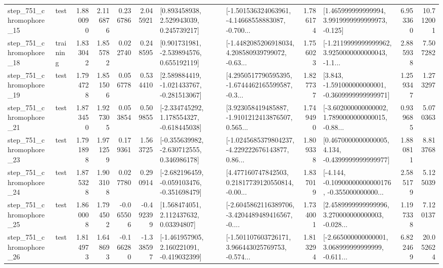 \begin{tabular}{llrrrrllrlrr}
  step\_751\_chromophore\_15 &      test &      1.880090 &    2.116876 &      0.236786 &  2.045921 &     [0.893458938, 2.529943039, 0.245739217] &  [-1.501536324063961, -4.14668558883087, -0.700... &       1.786174 &    [1.465999999999994, 3.9919999999999973, -0.125] &            6.953360 &         10.712001 \\
  step\_751\_chromophore\_18 &  training &      1.833042 &    1.855782 &      0.022740 &  0.248595 &    [0.901731981, -2.539894576, 0.655192119] &  [-1.4482085206918034, 4.208580939799072, -0.63... &       1.756023 &  [-1.2119999999999962, 3.9250000000000043, -1.1... &            2.885938 &          7.507282 \\
  step\_751\_chromophore\_19 &      test &      1.794728 &    1.851506 &      0.056778 &  0.534410 &   [2.589884419, -1.021433767, -0.281513067] &  [4.2950517790595395, -1.6744462165599587, -0.3... &       1.827737 &   [3.843, -1.591000000000001, -0.3609999999999971] &            1.259347 &          1.273297 \\
  step\_751\_chromophore\_21 &      test &      1.873450 &    1.927305 &      0.053854 &  0.509855 &   [-2.334745292, 1.178554327, -0.618445038] &  [3.923058419485887, -1.9101212413876507, 0.565... &       1.749490 &  [-3.602000000000002, 1.7890000000000015, -0.88... &            0.939685 &          5.070363 \\
  step\_751\_chromophore\_23 &      test &      1.791898 &    1.971259 &      0.179361 &  1.563725 &   [-0.355639982, -2.630712555, 0.346986178] &  [-1.0245685379804237, -4.229222676143877, 0.86... &       1.809338 &   [0.4670000000000005, 4.134, -0.4399999999999977] &            1.880811 &          8.813768 \\
  step\_751\_chromophore\_24 &      test &      1.875328 &    1.903108 &      0.027780 &  0.290914 &  [-2.682196459, -0.059103476, -0.351698479] &  [4.477160747842503, 0.21817739120550814, -0.00... &       1.837019 &  [-4.144, -0.10900000000000176, -0.355000000000... &            2.585179 &          5.125039 \\
  step\_751\_chromophore\_25 &      test &      1.860008 &    1.794502 &     -0.065506 & -0.492399 &      [1.568474051, 2.112437632, 0.03394807] &  [-2.6045862116389706, -3.4204489489416567, -0.... &       1.734001 &  [2.4589999999999996, 3.270000000000003, -0.028... &            1.197338 &          7.120137 \\
  step\_751\_chromophore\_26 &      test &      1.814973 &    1.648693 &     -0.166280 & -1.338597 &   [-1.461957905, 2.160221091, -0.419032399] &  [-1.501107603726171, 3.966443025769753, -0.574... &       1.813294 &  [-2.665000000000001, 3.068999999999999, -0.611... &            6.822469 &         20.052624 \\

\end{tabular}

